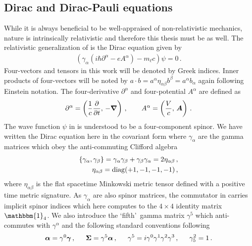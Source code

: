 \subsection{Dirac and Dirac-Pauli equations}
\label{sec:dp}
\noindent While it is always beneficial to be well-appraised of non-relativistic mechanics, nature is intrinsically relativistic and therefore this thesis must be as well. The relativistic generalization of  is the Dirac equation given by
\begin{align}
    \label{dirac:1}
    \left(\gamma_{\alpha}\left(i\hbar\partial^{\alpha} - eA^{\alpha}\right)-m_{\ell}c\right)\psi=0\,.
\end{align}
Four-vectors and tensors in this work will be denoted by Greek indices. Inner products of four-vectors will be noted by $a\cdot b=a^{\alpha}\eta_{\alpha\beta}b^{\beta}=a^{\alpha}b_{\alpha}$ again following Einstein notation. The four-derivative $\partial^{\alpha}$ and four-potential $A^{\alpha}$ are defined as
\begin{align}
    \label{dirac:2}
    \partial^{\alpha}=\left(\frac{1}{c}\frac{\partial}{\partial t},\,-\boldsymbol{\nabla}\right)\,,\qquad A^{\alpha}=\left(\frac{V}{c},\,\boldsymbol{A}\right)\,.
\end{align}
The wave function $\psi$ in  is understood to be a four-component spinor. We have written the Dirac equation here in the covariant form where $\gamma_{\alpha}$ are the gamma matrices which obey the anti-commuting Clifford algebra
\begin{align}
    \label{gamma:1}
    \{\gamma_{\alpha},\gamma_{\beta}\}=\gamma_{\alpha}\gamma_{\beta} + \gamma_{\beta}\gamma_{\alpha} = 2\eta_{\alpha\beta}\,,\\
    \eta_{\alpha\beta}={\rm diag}(+1,-1,-1,-1)\,,
\end{align}
where $\eta_{\alpha\beta}$ is the flat spacetime Minkowski metric tensor defined with a positive time metric signature. As $\gamma_{\alpha}$ are also spinor matrices, the commutator in  carries implicit spinor indices which here computes to the $4\times4$ identity matrix $\mathbbm{1}_{4}$. We also introduce the \lq fifth\rq\ gamma matrix $\gamma^{5}$ which anti-commutes with $\gamma^{\alpha}$ and the following standard conventions following~\cite{Itzykson:1980rh}
\begin{alignat}{1}
	\label{conventions:1} \bb{\alpha}=\gamma^{0}\bb{\gamma}\,,\indent \bb{\Sigma}=\gamma^{5}\bb{\alpha}\,,\indent \gamma^{5}=i\gamma^{0}\gamma^{1}\gamma^{2}\gamma^{3}\,,\indent \gamma^{2}_{5}=1\,.
\end{alignat}

